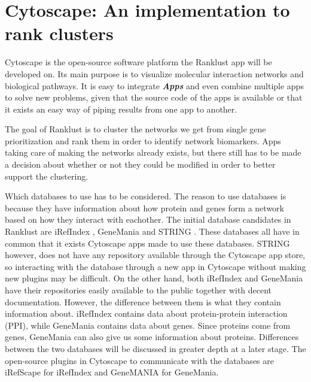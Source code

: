 \documentclass[UKenglish]{ifimaster}
\begin{document}
\chapter{Cytoscape: An implementation to rank clusters}
Cytoscape is the open-source software platform the Ranklust app will be developed on. Its main purpose is to visualize
molecular interaction networks and biological pathways.  It is easy to integrate \textbf{\textit{Apps}} and even combine 
multiple apps to solve new problems, given that the source code of the apps is available or that it exists an easy way of 
piping results from one app to another. 

The goal of Ranklust is to cluster the networks we get from single gene prioritization and rank them in order to 
identify network biomarkers. Apps taking care of making the networks already exists, but there still has to be made a 
decision about whether or not they could be modified in order to better support the clustering.

Which databases to use has to be considered. The reason to use databases is because they have information about how 
protein and genes form a network based on how they interact with eachother. The initial database candidates in Ranklust 
are iRefIndex \cite{iri}, GeneMania \cite{gm} and STRING \cite{str}. These databases all have in common that it exists
Cytoscape apps made to use these databases. STRING however, does not have any repository available through the Cytoscape
app store, so interacting with the database through a new app in Cytoscape without making new plugins may be difficult.
On the other hand, both iRefIndex and GeneMania have their repositories easily available to the public together with
decent documentation. However, the difference between them is what they contain information about. iRefIndex contains
data about protein-protein interaction (PPI), while GeneMania contains data about genes.
Since proteins come from genes, GeneMania can also give us some information about proteins. Differences between the
two databases will be discussed in greater depth at a later stage.
The open-source plugins in Cytoscape to communicate with the databases are iRefScape \cite{iridb} for iRefIndex and 
GeneMANIA \cite{gmdb} for GeneMania.
\end{document}
